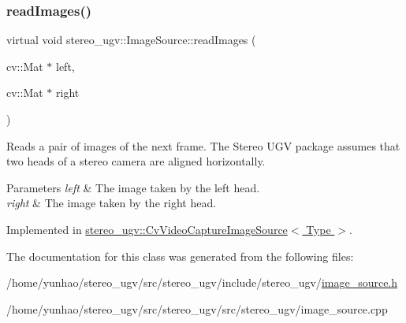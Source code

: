 \subsubsection{\texorpdfstring{read\+Images()}{readImages()}}
{\footnotesize\ttfamily virtual void stereo\+\_\+ugv\+::\+Image\+Source\+::read\+Images (\begin{DoxyParamCaption}\item[{cv\+::\+Mat $\ast$}]{left,  }\item[{cv\+::\+Mat $\ast$}]{right }\end{DoxyParamCaption})\hspace{0.3cm}{\ttfamily [pure virtual]}}



Reads a pair of images of the next frame. The Stereo U\+GV package assumes that two heads of a stereo camera are aligned horizontally. 


\begin{DoxyParams}{Parameters}
{\em left} & The image taken by the left head. \\
\hline
{\em right} & The image taken by the right head. \\
\hline
\end{DoxyParams}


Implemented in \hyperlink{classstereo__ugv_1_1CvVideoCaptureImageSource_a6636c97811bb28d59453c3865b0bda69}{stereo\+\_\+ugv\+::\+Cv\+Video\+Capture\+Image\+Source$<$ Type $>$}.



The documentation for this class was generated from the following files\+:\begin{DoxyCompactItemize}
\item 
/home/yunhao/stereo\+\_\+ugv/src/stereo\+\_\+ugv/include/stereo\+\_\+ugv/\hyperlink{image__source_8h}{image\+\_\+source.\+h}\item 
/home/yunhao/stereo\+\_\+ugv/src/stereo\+\_\+ugv/src/stereo\+\_\+ugv/image\+\_\+source.\+cpp\end{DoxyCompactItemize}
